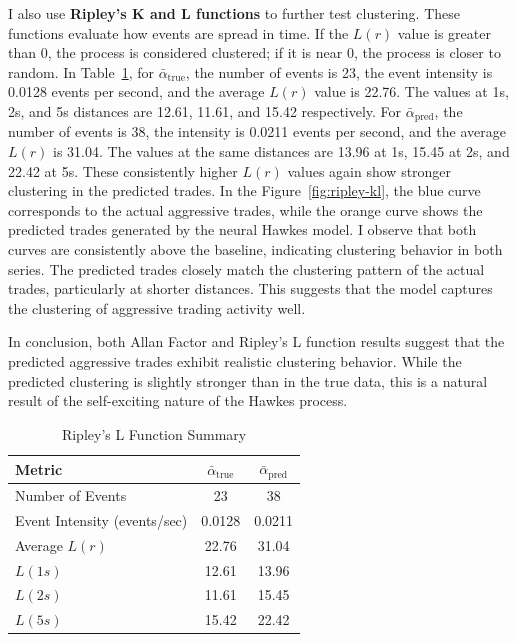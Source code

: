 I also use \textbf{Ripley's K and L functions} to further test clustering. These functions evaluate how events are spread in time. If the \( L(r) \) value is greater than 0, the process is considered clustered; if it is near 0, the process is closer to random. In Table~\ref{tb:ripley-l}, for $\bar{\alpha}_\text{true}$, the number of events is 23, the event intensity is 0.0128 events per second, and the average \( L(r) \) value is 22.76. The values at 1s, 2s, and 5s distances are 12.61, 11.61, and 15.42 respectively. For $\bar{\alpha}_\text{pred}$, the number of events is 38, the intensity is 0.0211 events per second, and the average \( L(r) \) is 31.04. The values at the same distances are 13.96 at 1s, 15.45 at 2s, and 22.42 at 5s. These consistently higher \( L(r) \) values again show stronger clustering in the predicted trades. In the Figure~\ref{fig:ripley-kl}, the blue curve corresponds to the actual aggressive trades, while the orange curve shows the predicted trades generated by the neural Hawkes model. I observe that both curves are consistently above the baseline, indicating clustering behavior in both series. The predicted trades closely match the clustering pattern of the actual trades, particularly at shorter distances. This suggests that the model captures the clustering of aggressive trading activity well.

In conclusion, both Allan Factor and Ripley's L function results suggest that the predicted aggressive trades exhibit realistic clustering behavior. While the predicted clustering is slightly stronger than in the true data, this is a natural result of the self-exciting nature of the Hawkes process.

\begin{table}[H]
    \centering
    \caption{Ripley's L Function Summary}
    \label{tb:ripley-l}
    \begin{tabular}{lcc}
    \toprule
    \textbf{Metric} & $\bar{\alpha}_\text{true}$ & $\bar{\alpha}_\text{pred}$ \\
    \midrule
    Number of Events & 23 & 38 \\
    Event Intensity (events/sec) & 0.0128 & 0.0211 \\
    Average \( L(r) \) & 22.76 & 31.04 \\
    \( L(1s) \) & 12.61 & 13.96 \\
    \( L(2s) \) & 11.61 & 15.45 \\
    \( L(5s) \) & 15.42 & 22.42 \\
    \bottomrule
    \end{tabular}
\end{table}

